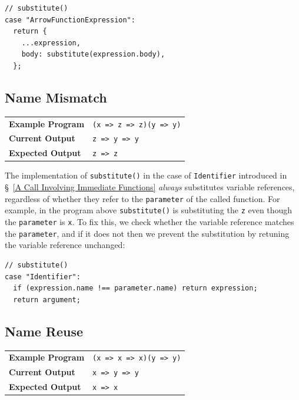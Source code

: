 \documentclass[12pt, oneside]{book}
\begin{document}
\begin{verbatim}
// substitute()
case "ArrowFunctionExpression":
  return {
    ...expression,
    body: substitute(expression.body),
  };
\end{verbatim}

\subsection{Name Mismatch}

\begin{center}
\begin{tabular}{ll}
\textbf{Example Program} & \texttt{(x => z => z)(y => y)} \\
\textbf{Current Output} & \texttt{z => y => y} \\
\textbf{Expected Output} & \texttt{z => z} \\
\end{tabular}
\end{center}

The implementation of \texttt{substitute()} in the case of \texttt{Identifier} introduced in §~\ref{A Call Involving Immediate Functions} \emph{always} substitutes variable references, regardless of whether they refer to the \texttt{parameter} of the called function. For example, in the program above \texttt{substitute()} is substituting the \texttt{z} even though the \texttt{parameter} is \texttt{x}. To fix this, we check whether the variable reference matches the \texttt{parameter}, and if it does not then we prevent the substitution by retuning the variable reference unchanged:

\begin{verbatim}
// substitute()
case "Identifier":
  if (expression.name !== parameter.name) return expression;
  return argument;
\end{verbatim}

\subsection{Name Reuse}
\label{Step 0: Name Reuse}

\begin{center}
\begin{tabular}{ll}
\textbf{Example Program} & \texttt{(x => x => x)(y => y)} \\
\textbf{Current Output} & \texttt{x => y => y} \\
\textbf{Expected Output} & \texttt{x => x} \\
\end{tabular}
\end{center}
\end{document}
